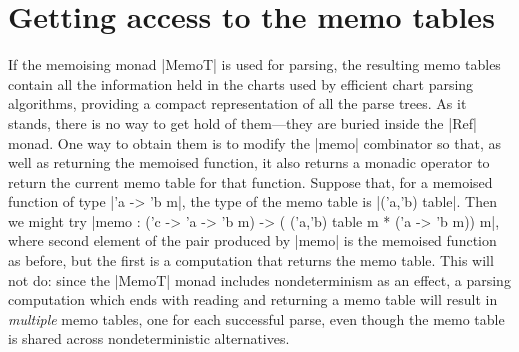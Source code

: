 \section{Getting access to the memo tables}
\label{s:contmemotable}

If the memoising monad |MemoT| is used for parsing, the resulting memo
tables contain all the information held in the charts used by efficient chart parsing algorithms,
providing a compact representation of all the parse trees. As it
stands, there is no way to get hold of them---they are buried inside the |Ref| monad.
One way to obtain them is to modify the |memo| combinator so
that, as well as returning the memoised function, it also returns a monadic 
operator to return the current memo table for that function. Suppose that,
for a memoised function of type |'a -> 'b m|, the type of the memo table is
|('a,'b) table|. Then we might try 
|memo : ('c -> 'a -> 'b m) -> ( ('a,'b) table m * ('a -> 'b m)) m|, where
second element of the pair produced by |memo| is the memoised function as before,
but the first is a computation that returns the memo table.
This will not do: since the |MemoT|
monad includes nondeterminism as an effect, a parsing computation which ends
with reading and returning a memo table will result in \emph{multiple} memo tables,
one for each successful parse, even though the memo table is shared across
nondeterministic alternatives. 

